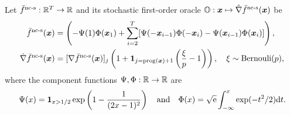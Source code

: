 \documentclass{article}
\begin{document}

\begin{dfn} \label{dfn:Arj-NC-chain-stoc}
Let $\bar f^{\text{nc-s}}: {\mathbb{R}}^T \rightarrow {\mathbb{R}}$ and its stochastic first-order oracle ${\mathbb{O}} : {\bm{x}} \mapsto \hat \nabla \bar f^{\text{nc-s}}({\bm{x}})$ be 
\begin{align*}
    \bar f^{\text{nc-s}}({\bm{x}}) &=  \left( -\Psi(1) \Phi({\bm{x}}_1) + \sum_{i=2}^T [\Psi(-{\bm{x}}_{i-1}) \Phi(-{\bm{x}}_i) - \Psi({\bm{x}}_{i-1} ) \Phi({\bm{x}}_i)] \right), \\
    \hat \nabla \bar f^{\text{nc-s}}({\bm{x}}) &= [\nabla \bar f^\text{nc-s}({\bm{x}})]_j  \left( 1 +
    {\bm{1}}_{j= {\rm prog}({\bm{x}}) +1} \left( \frac{\xi}{p}-1\right) \right), \quad \xi \sim {\rm Bernouli}(p), 
\end{align*}
where the component functions $\Psi, \Phi: {\mathbb{R}} \rightarrow {\mathbb{R}}$ are 
\begin{align*}
    \Psi(x) =  {\bm{1}}_{x>1/2} \exp \left( 1 -\frac{1}{(2x-1)^2} \right) \quad {\rm and} \quad \Phi(x) = \sqrt{\rm e} \int_{-\infty}^x \exp(- t^2/2 ) {\rm d}t.
\end{align*}
\end{dfn}

\end{document}
